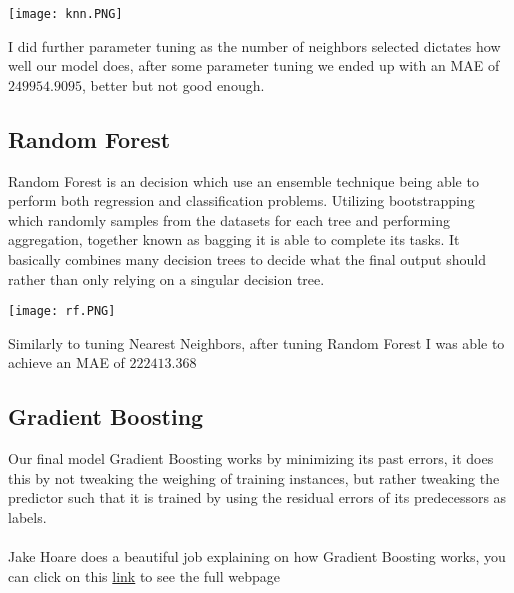 \documentclass{article}
\begin{document}
\begin{titlepage}
\begin{center}
\texttt{[image: knn.PNG]}
\end{center}

I did further parameter tuning as the number of neighbors selected dictates how well our model does, after some parameter tuning we ended up with an MAE of $249954.9095$, better but not good enough.
\subsection{Random Forest}

Random Forest is an decision which use an ensemble technique being able to perform both regression and classification problems. Utilizing  bootstrapping which randomly samples from the datasets for each tree and performing aggregation, together known as bagging it is able to complete its tasks. It basically combines many decision trees to decide what the final output should rather than only relying on a singular decision tree.  

\begin{center}
\texttt{[image: rf.PNG]}
\end{center}

Similarly to tuning Nearest Neighbors, after tuning Random Forest I was able to achieve an MAE of $222413.368$

\subsection{Gradient Boosting}

Our final model Gradient Boosting works by minimizing its past errors, it does this by not tweaking the weighing of training instances, but rather tweaking the predictor such that it is trained by using the residual errors of its predecessors as labels. \\
\\

Jake Hoare does  a beautiful job explaining on how Gradient Boosting works, you can click on this  \href{https://www.geeksforgeeks.org/ml-gradient-boosting/}{link} to see the full webpage


\end{titlepage}
\end{document}
